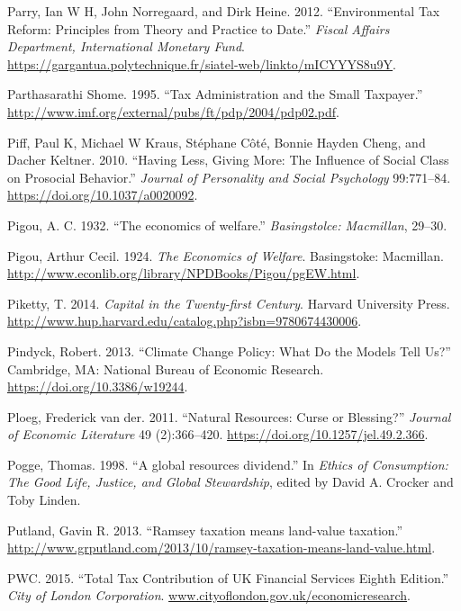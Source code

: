 \documentclass[]{tufte-handout}
\begin{document}
\leavevmode\hypertarget{ref-Parry2012}{}%
Parry, Ian W H, John Norregaard, and Dirk Heine. 2012. ``Environmental
Tax Reform: Principles from Theory and Practice to Date.'' \emph{Fiscal
Affairs Department, International Monetary Fund}.
\url{https://gargantua.polytechnique.fr/siatel-web/linkto/mICYYYS8u9Y}.

\leavevmode\hypertarget{ref-ParthasarathiShome}{}%
Parthasarathi Shome. 1995. ``Tax Administration and the Small
Taxpayer.''
\url{http://www.imf.org/external/pubs/ft/pdp/2004/pdp02.pdf}.

\leavevmode\hypertarget{ref-Piff2010}{}%
Piff, Paul K, Michael W Kraus, Stéphane Côté, Bonnie Hayden Cheng, and
Dacher Keltner. 2010. ``Having Less, Giving More: The Influence of
Social Class on Prosocial Behavior.'' \emph{Journal of Personality and
Social Psychology} 99:771--84. \url{https://doi.org/10.1037/a0020092}.

\leavevmode\hypertarget{ref-Pigou1932}{}%
Pigou, A. C. 1932. ``The economics of welfare.'' \emph{Basingstolce:
Macmillan}, 29--30.

\leavevmode\hypertarget{ref-Pigou1924}{}%
Pigou, Arthur Cecil. 1924. \emph{The Economics of Welfare}. Basingstoke:
Macmillan.
\url{http://www.econlib.org/library/NPDBooks/Pigou/pgEW.html}.

\leavevmode\hypertarget{ref-Piketty2014a}{}%
Piketty, T. 2014. \emph{Capital in the Twenty-first Century}. Harvard
University Press.
\url{http://www.hup.harvard.edu/catalog.php?isbn=9780674430006}.

\leavevmode\hypertarget{ref-Pindyck2013}{}%
Pindyck, Robert. 2013. ``Climate Change Policy: What Do the Models Tell
Us?'' Cambridge, MA: National Bureau of Economic Research.
\url{https://doi.org/10.3386/w19244}.

\leavevmode\hypertarget{ref-Ploeg2011}{}%
Ploeg, Frederick van der. 2011. ``Natural Resources: Curse or
Blessing?'' \emph{Journal of Economic Literature} 49 (2):366--420.
\url{https://doi.org/10.1257/jel.49.2.366}.

\leavevmode\hypertarget{ref-Pogge1998}{}%
Pogge, Thomas. 1998. ``A global resources dividend.'' In \emph{Ethics of
Consumption: The Good Life, Justice, and Global Stewardship}, edited by
David A. Crocker and Toby Linden.

\leavevmode\hypertarget{ref-Putland2013}{}%
Putland, Gavin R. 2013. ``Ramsey taxation means land-value taxation.''
\url{http://www.grputland.com/2013/10/ramsey-taxation-means-land-value.html}.

\leavevmode\hypertarget{ref-PWC2015}{}%
PWC. 2015. ``Total Tax Contribution of UK Financial Services Eighth
Edition.'' \emph{City of London Corporation}.
\url{www.cityoflondon.gov.uk/economicresearch}.
\end{document}
